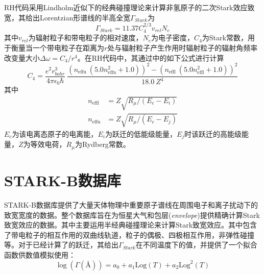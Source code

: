 RH代码采用Lindholm近似\parencites{Lindholm1945,Foley1946,Mihalas2014}下的经典碰撞理论来计算非氢原子的二次Stark效应致宽，其给出Lorentzian形谱线的半高全宽$\Gamma_{Stark}$为
\begin{equation}
    \Gamma_{Stark}=11.37C_4^{2/3}v_{rel}N_e
\end{equation}
其中$v_{rel}$为辐射粒子和带电粒子的相对速度，$N_e$为电子密度，$C_4$为Stark常数，用于衡量当一个带电粒子在距离为$r$处与辐射粒子产生作用时辐射粒子的辐射角频率改变量大小$\Delta \omega = C_4/r^4$。在RH代码中，其通过\textcites{Traving1960}中的如下公式进行计算
\begin{equation}
    C_4 = \frac{e^2 r_{bohr}^3}{4 \pi \epsilon_0 \hbar}\  \frac {\left(n_{\mathrm{effu}} \  \left(5.0  n_{\mathrm{effu}}^2 + 1.0\right)\right)^2 - \left(n_{\mathrm{effl}} \  \left(5.0  n_{\mathrm{effl}}^2 + 1.0\right)\right)^2}{18.0 \  Z^4}    
\end{equation}
其中
\begin{align}
	n_{\mathrm{effl}} &=Z \sqrt{R_{\mu} /\left(E_{c}-E_{i}\right)} \\
	n_{\mathrm{effu}} &=Z \sqrt{R_{\mu} /\left(E_{c}-E_{j}\right)}
\end{align}
$E_c$为该电离态原子的电离能，$E_i$为跃迁的低能级能量，$E_j$时该跃迁的高能级能量，$Z$为等效电荷，$R_\mu$为Rydberg常数。
\section{STARK-B数据库}\label{sec:2.3}
STARK-B数据库\parencites{STARK-B}提供了大量天体物理中重要原子谱线在周围电子和离子扰动下的致宽宽度的数据。整个数据库旨在为恒星大气和包层(\textit{envelope})提供精确计算Stark致宽效应的数据。其中主要运用半经典碰撞理论\parencites{Brechot1969a,Brechot1969b,Fleurier1977,}来计算Stark致宽效应。其中包含了带电粒子的相互作用的双曲线轨道，粒子的偶极、四极相互作用，非弹性碰撞等。对于已经计算了的跃迁，其给出$\Gamma_{Stark}$在不同温度下的值，并提供了一个拟合函数供数值模拟使用\parencites{Brechot2011}：
\begin{equation}
    \log\left(\Gamma (\mbox{{\AA}})\right) = a_0 + a_1\mathrm{Log}(T) + a_2\mathrm{Log}^2(T) 
\end{equation}

